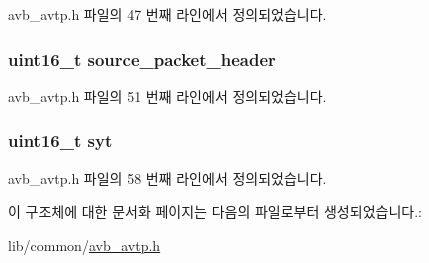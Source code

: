 avb\+\_\+avtp.\+h 파일의 47 번째 라인에서 정의되었습니다.

\subsubsection[{\texorpdfstring{source\+\_\+packet\+\_\+header}{source_packet_header}}]{\setlength{\rightskip}{0pt plus 5cm}uint16\+\_\+t source\+\_\+packet\+\_\+header}\hypertarget{structsix1883__header_a249b482e00959f3c2d3596b684142a90}{}\label{structsix1883__header_a249b482e00959f3c2d3596b684142a90}


avb\+\_\+avtp.\+h 파일의 51 번째 라인에서 정의되었습니다.

\subsubsection[{\texorpdfstring{syt}{syt}}]{\setlength{\rightskip}{0pt plus 5cm}uint16\+\_\+t syt}\hypertarget{structsix1883__header_aec1f53b0b9c6795a8e0f8f4e029fa676}{}\label{structsix1883__header_aec1f53b0b9c6795a8e0f8f4e029fa676}


avb\+\_\+avtp.\+h 파일의 58 번째 라인에서 정의되었습니다.



이 구조체에 대한 문서화 페이지는 다음의 파일로부터 생성되었습니다.\+:\begin{DoxyCompactItemize}
\item 
lib/common/\hyperlink{avb__avtp_8h}{avb\+\_\+avtp.\+h}\end{DoxyCompactItemize}
